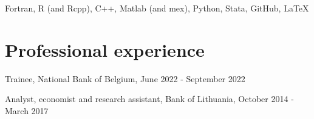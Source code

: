 \documentclass[10pt]{article}
\begin{document}
	\hspace{1em} Fortran, R (and Rcpp), C++, Matlab (and mex), Python, Stata, GitHub, \LaTeX
	
   	\vspace{0.5em}
   
   \section*{Professional experience}
	\vspace{-0.5em}
	
	\hspace{1em} Trainee, National Bank of Belgium, June 2022 - September 2022
		
	\smallskip
		
	\hspace{1em} Analyst, economist and research assistant, Bank of Lithuania, October 2014 - March 2017

%	
	
	
	
\end{document}
